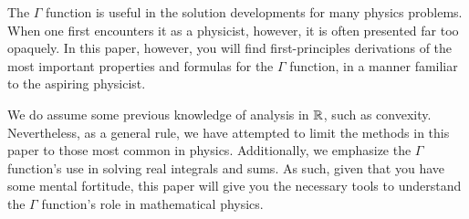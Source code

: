 The $\Gamma$ function is useful in the solution developments for many physics problems.
When one first encounters it as a physicist, however, it is often presented far too opaquely. 
In this paper, however, you will find first-principles derivations of the most important properties and formulas for the $\Gamma$ function, in a manner familiar to the aspiring physicist.

We do assume some previous knowledge of analysis in $\mathbb{R}$, such as convexity.
Nevertheless, as a general rule, we have attempted to limit the methods in this paper to those most common in physics.
Additionally, we emphasize the $\Gamma$ function's use in solving real integrals and sums.
As such, given that you have some mental fortitude, this paper will give you the necessary tools to understand the $\Gamma$ function's role in mathematical physics.